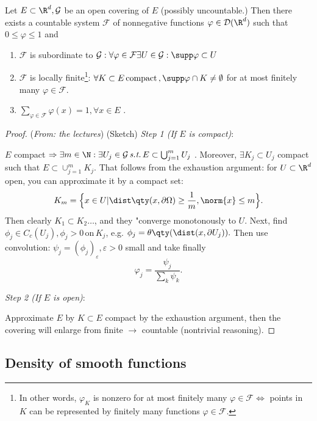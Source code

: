 \begin{lemma}
	Let $E \subset \R^d, \mathcal{G}$ be an open covering of $E$ (possibly uncountable.) Then there exists a countable system $\mathcal{F}$ of nonnegative functions $\varphi \in \mathcal{D}(\R^d)$ such that $0 \leq \varphi \leq 1$ and 
	\begin{enumerate}
		\item $\mathcal{F}$ is subordinate to $\mathcal{G}: \forall \varphi \in \mathcal{F} \exists U \in \mathcal{G}: \supp \varphi \subset U$
		\item $\mathcal{F}$ is locally finite\footnote{In other words, $\varphi_K$ is nonzero for at most finitely many $\varphi \in \mathcal{F} \Leftrightarrow$ points in $K$ can be represented by finitely many functions $\varphi \in \mathcal{F}.$}: $\forall K \subset E \, \text{compact} \,, \supp \varphi \cap K \neq \emptyset$ for at most finitely many $\varphi \in \mathcal{F}$.
		\item $\sum_{\varphi \in \mathcal{F}} \varphi(x) = 1, \forall x \in E$ .
	\end{enumerate}
\end{lemma}
\begin{proof}(\textit{From: the lectures})
	(Sketch)
	\textit{Step 1 (If $E$ is compact)}:

	$E$ compact $\Rightarrow \exists m \in \N: \exists U_j \in \mathcal{G} \, \text{\textit{s.t.}} \, E \subset \bigcup_{j=1}^{m}U_j$ . Moreover, $\exists K_j \subset U_j$ compact such that $E \subset \cup_{j=1}^m K_j$. That follows from the exhaustion argument: for $U \subset \R^d$ open, you can approximate it by a compact set:
	\[
		K_m = \Big\{x \in U| \dist\qty(x,\partial \Omega) \geq \frac{1}{m}, \norm{x} \leq m \Big\}.
	\]
	Then clearly $K_1 \subset K_2 \dots $, and they "converge monotonously to $U$.
	Next, find $\phi_j \in C_c(U_j), \phi_j >0 \, \text{on} \, K_j$, e.g. $\phi_j = \theta\qty(\dist(x,\partial U_j)).$ Then use convolution: $\psi_j = (\phi_j)_{\varepsilon}, \varepsilon > 0$ small and take finally
	\[
		\varphi_j = \frac{\psi_j}{\sum_k \psi_k}.
	\]
	

	\textit{Step 2 (If $E$ is open)}:

	Approximate $E$ by $K \subset E$ compact by the exhaustion argument, then the covering will enlarge from finite $\to$ countable (nontrivial reasoning).
\end{proof}


\subsection{Density of smooth functions}
\label{sec:density}

